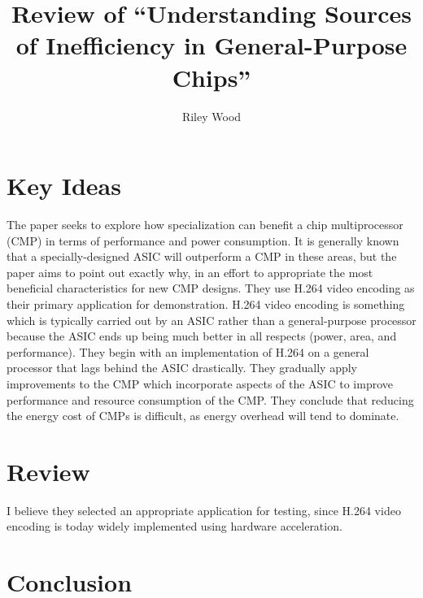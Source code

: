 \documentclass{article}
\title{Review of ``Understanding Sources of Inefficiency in General-Purpose
Chips'' \cite{Hameed:2010}}
\author{Riley Wood}
\begin{document}
\maketitle


\section*{Key Ideas}
The paper seeks to explore how specialization can benefit a chip multiprocessor
(CMP) in terms of performance and power consumption. It is generally known that a
specially-designed ASIC will outperform a CMP in these areas, but the paper aims
to point out exactly why, in an effort to appropriate the most beneficial
characteristics for new CMP designs. They use H.264 video encoding as their
primary application for demonstration. H.264 video encoding is something which
is typically carried out by an ASIC rather than a general-purpose processor
because the ASIC ends up being much better in all respects (power, area, and
performance). They begin with an implementation of H.264 on a general processor
that lags behind the ASIC drastically. They gradually apply improvements to the
CMP which incorporate aspects of the ASIC to improve performance and
resource consumption of the CMP. They conclude that reducing the energy cost of
CMPs is difficult, as energy overhead will tend to dominate.

\section*{Review}
I believe they selected an appropriate application for testing, since H.264
video encoding is today widely implemented using hardware acceleration.

\section*{Conclusion}





\end{document}
